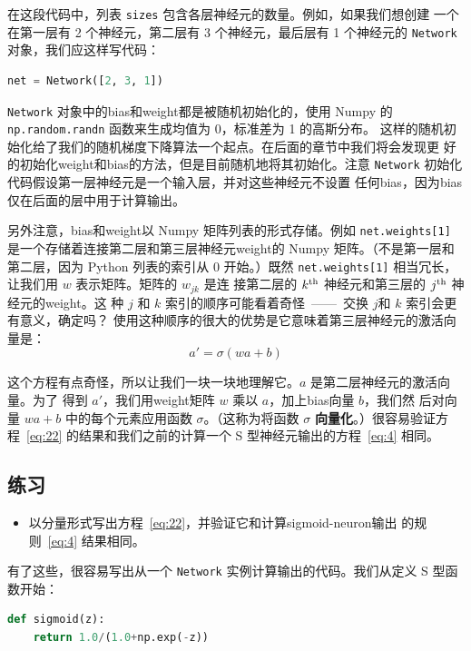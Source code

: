 在这段代码中，列表 \lstinline!sizes! 包含各层神经元的数量。例如，如果我们想创建
一个在第一层有 2 个神经元，第二层有 3 个神经元，最后层有 1 个神经元的
\lstinline!Network! 对象，我们应这样写代码：
\begin{lstlisting}[language=Python]
net = Network([2, 3, 1])
\end{lstlisting}

\lstinline!Network! 对象中的\gls*{bias}和\gls*{weight}都是被随机初始化的，使用
Numpy 的 \lstinline!np.random.randn! 函数来生成均值为 0，标准差为 1 的高斯分布。
这样的随机初始化给了我们的随机梯度下降算法一个起点。在后面的章节中我们将会发现更
好的初始化\gls*{weight}和\gls*{bias}的方法，但是目前随机地将其初始化。注意
\lstinline!Network! 初始化代码假设第一层神经元是一个输入层，并对这些神经元不设置
任何\gls*{bias}，因为\gls*{bias}仅在后面的层中用于计算输出。

另外注意，\gls*{bias}和\gls*{weight}以 Numpy 矩阵列表的形式存储。例如
\lstinline!net.weights[1]! 是一个存储着连接第二层和第三层神经元\gls*{weight}的
Numpy 矩阵。（不是第一层和第二层，因为 Python 列表的索引从 0 开始。）既然
\lstinline!net.weights[1]! 相当冗长，让我们用 $w$ 表示矩阵。矩阵的 $w_{jk}$ 是连
接第二层的 $k^{\rm th}$ 神经元和第三层的 $j^{\rm th}$ 神经元的\gls*{weight}。这
种 $j$ 和 $k$ 索引的顺序可能看着奇怪~——~交换 $j$和 $k$ 索引会更有意义，确定吗？
使用这种顺序的很大的优势是它意味着第三层神经元的激活向量是：
\begin{equation}
  a' = \sigma(w a + b)
  \label{eq:22}\tag{22}
\end{equation}

这个方程有点奇怪，所以让我们一块一块地理解它。$a$ 是第二层神经元的激活向量。为了
得到 $a'$，我们用\gls*{weight}矩阵 $w$ 乘以 $a$，加上\gls*{bias}向量 $b$，我们然
后对向量 $w a +b$ 中的每个元素应用函数 $\sigma$。（这称为将函数 $\sigma$
  \textbf{向量化}。）很容易验证方程~\eqref{eq:22} 的结果和我们之前的计算一个 S
型神经元输出的方程~\eqref{eq:4} 相同。

\subsection*{练习}

\begin{itemize}
\item 以分量形式写出方程~\eqref{eq:22}，并验证它和计算\gls*{sigmoid-neuron}输出
  的规则~\eqref{eq:4} 结果相同。
\end{itemize}

有了这些，很容易写出从一个 \lstinline!Network! 实例计算输出的代码。我们从定义 S
型函数开始：
\begin{lstlisting}[language=Python]
def sigmoid(z):
    return 1.0/(1.0+np.exp(-z))
\end{lstlisting}

